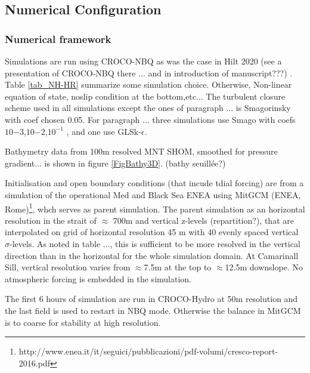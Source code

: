 \subsection{Numerical Configuration}
\label{section3Dnum}
\subsubsection{Numerical framework}

Simulations are run using CROCO-NBQ as was the case in Hilt 2020 (see a presentation of CROCO-NBQ there ... and in introduction of manuscript???) . Table \ref{tab_NH-HR} summarize some simulation choice. Otherwise, Non-linear equation of state, noslip condition at the bottom,etc...  The turbulent closure scheme used in all simulations except the ones of paragraph ... is Smagorinsky with coef chosen 0.05. For paragraph ... three simulations use Smago with coefs $10{-3}$,$10{-2}$,$10^{-1}$ , and one use GLSk-$\epsilon$.

Bathymetry data from 100m resolved MNT SHOM, smoothed for pressure gradient... is shown in figure \ref{FigBathy3D}. (bathy seuillée?)


Initialisation and open boundary conditions (that incude tdial forcing) are from a simulation of the operational Med and Black Sea ENEA using MitGCM (ENEA, Rome)\footnote{http://www.enea.it/it/seguici/pubblicazioni/pdf-volumi/cresco-report-2016.pdf}, whch serves as parent simulation. The parent simulation as an horizontal resolution in the strait of $\approx$ 700m and vertical z-levels (repartition?), that are interpolated on grid of horizontal resolution 45 m with 40 evenly spaced vertical $\sigma$-levels. As noted in table ..., this is sufficient to be more resolved in the vertical direction than in the horizontal for the whole simulation domain. At Camarinall Sill, vertical resolution varies from $\approx$7.5m at the top to $\approx$12.5m downslope. No atmospheric forcing is embedded in the simulation.

The first 6 hours of simulation are run in CROCO-Hydro at 50m resolution and the last field is used to restart in NBQ mode. Otherwise the balance in MitGCM is to coarse for stability at high resolution.


